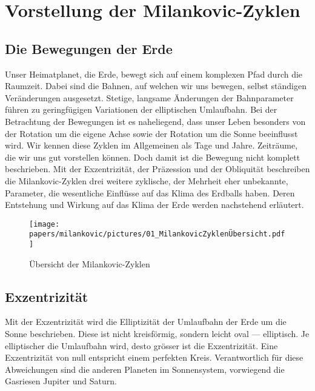 %
%
%
%
\section{Vorstellung der Milankovic-Zyklen
\label{milankovic:section:VorstellungMIlankovic-Zyklen}}

\subsection{Die Bewegungen der Erde
\label{milankovic:subsection:BewegungenderErde}}
Unser Heimatplanet, die Erde, bewegt sich auf einem komplexen Pfad durch die Raumzeit.
Dabei sind die Bahnen, auf welchen wir uns bewegen, selbst ständigen Veränderungen ausgesetzt.
Stetige, langsame Änderungen der Bahnparameter führen zu geringfügigen Variationen der elliptischen Umlaufbahn.
Bei der Betrachtung der Bewegungen ist es naheliegend, dass unser Leben besonders von der Rotation um die eigene Achse sowie der Rotation um die Sonne beeinflusst wird.
Wir kennen diese Zyklen im Allgemeinen als Tage und Jahre.
Zeiträume, die wir uns gut vorstellen können.
Doch damit ist die Bewegung nicht komplett beschrieben.
Mit der Exzentrizität, der Präzession und der Obliquität beschreiben die Milankovic-Zyklen drei weitere zyklische, der Mehrheit eher unbekannte, Parameter, die wesentliche Einflüsse auf das Klima des Erdballs haben.
Deren Entstehung und Wirkung auf das Klima der Erde werden nachstehend erläutert.

\begin{figure}
	\centering
	\texttt{[image: papers/milankovic/pictures/01\_MilankovicZyklenÜbersicht.pdf]}
	\caption{Übersicht der Milankovic-Zyklen
		\label{picture Übersicht Milankovic-Zyklen}}
\end{figure}

\subsection{Exzentrizität
\label{milankovic:subsection:Exzentrizität}}
Mit der Exzentrizität wird die Elliptizität der Umlaufbahn der Erde um die Sonne beschrieben.
Diese ist nicht kreisförmig, sondern leicht oval --- elliptisch.
Je elliptischer die Umlaufbahn wird, desto grösser ist die Exzentrizität.
Eine Exzentrizität von null entspricht einem perfekten Kreis.
Verantwortlich für diese Abweichungen sind die anderen Planeten im Sonnensystem, vorwiegend die Gasriesen Jupiter und Saturn.


